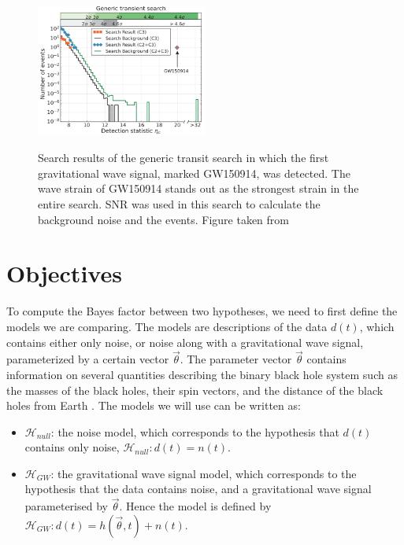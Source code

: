 \documentclass{article}
\begin{document}
\begin{figure}[h]
	\caption{Search results of the generic transit search in which the first gravitational wave signal, marked GW150914, was detected. The wave strain of GW150914 stands out as the strongest strain in the entire search. SNR was used in this search to calculate the background noise and the events. Figure taken from \cite{DetectionPaper}}
	\centering
	\includegraphics[width=0.5\textwidth]{DetectionInGenericTransientSearch} \label{Fig:Detection}
\end{figure}

 
 
 
 \section{Objectives}
 


To compute the Bayes factor between two hypotheses, we need to first define the models we are comparing. The models are descriptions of the data $d(t)$, which contains either only noise, or noise along with a gravitational wave signal, parameterized by a certain vector $\vec{\theta}$. The parameter vector $\vec{\theta}$ contains information on several quantities describing the binary black hole system such as the masses of the black holes, their spin vectors, and the distance of the black holes from Earth \cite{BaeStats}. The models we will use can be written as:

 



\begin{itemize}
	\item $\mathcal{H}_{null}$: the noise model, which corresponds to the hypothesis that $d(t)$ contains only noise,
	$\mathcal{H}_{null}: d(t) = n(t)$.
	\item $\mathcal{H}_{GW}$: the gravitational wave signal model, which corresponds to the hypothesis that the data contains noise, and a gravitational wave signal parameterised by $\vec{\theta}$. Hence the model is defined by $\mathcal{H}_{GW}: d(t) = h(\vec{\theta},t) + n(t)$.
\end{itemize}
 
\end{document}
